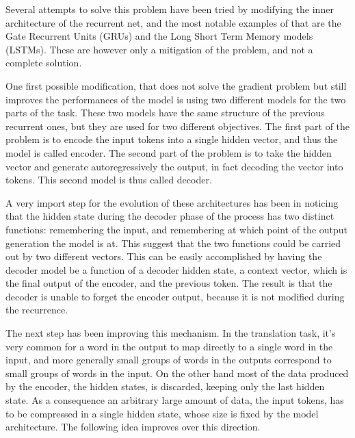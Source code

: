 \documentclass[]{marticle}
\begin{document}
Several attempts to solve this problem have been tried by modifying the inner architecture of the
recurrent net, and the most notable examples of that are the Gate Recurrent Units (GRUs) and the
Long Short Term Memory models (LSTMs). These are however only a mitigation of the problem, and not a
complete solution.

One first possible modification, that does not solve the gradient problem but still improves the
performances of the model is using two different models for the two parts of the task. These two
models have the same structure of the previous recurrent ones, but they are used for two different
objectives. The first part of the problem is to encode the input tokens into a single hidden vector,
and thus the model is called encoder. The second part of the problem is to take the hidden vector
and generate autoregressively the output, in fact decoding the vector into tokens. This second model
is thus called decoder.

A very import step for the evolution of these architectures has been in noticing that the hidden
state during the decoder phase of the process has two distinct functions: remembering the input, and
remembering at which point of the output generation the model is at. This suggest that the two
functions could be carried out by two different vectors. This can be easily accomplished by having
the decoder model be a function of a decoder hidden state, a context vector, which is the final
output of the encoder, and the previous token. The result is that the decoder is unable to forget
the encoder output, because it is not modified during the recurrence.

The next step has been improving this mechanism. In the translation task, it's very common for a
word in the output to map directly to a single word in the input, and more generally small groups of
words in the outputs correspond to small groups of words in the input. On the other hand most of the
data produced by the encoder, the hidden states, is discarded, keeping only the last hidden state.
As a consequence an arbitrary large amount of data, the input tokens, has to be compressed in a
single hidden state, whose size is fixed by the model architecture. The following idea improves over
this direction.
\end{document}
